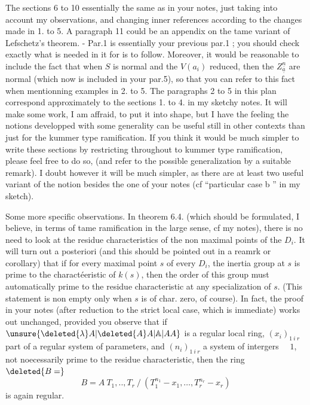 The sections 6 to 10 essentially the same as in your notes, just taking into account my observations, and changing inner references according to the changes made in 1. to 5. A paragraph 11 could be an appendix on the tame variant of Lefschetz's theorem. - Par.1 is essentially your previous par.1 ; you should check exactly what is needed in it for 
is to follow. Moreover, it would be reasonable to include the fact that when $S$ is normal and the $V(a_i)$ reduced, then the $Z^{\underline{n}}_{\underline{a}}$ are normal (which now is included in your par.5), so that you can refer to this fact when mentionning examples in  2. to 5. The paragraphs 2 to 5 in this plan correspond approximately to the sections 1. to 4. in my sketchy notes. It will make some work, I am affraid, to put it into shape, but I have the feeling the notions developped with some generality can be useful still in other contexts than just for the kummer type ramification. If you think it would be much simpler to write these sections by restricting throughout to kummer type ramification, please feel free to do so, (and refer to the possible generalization by a suitable remark). I doubt however it will be much simpler, as there are at least two useful variant of the notion besides the one of your notes (cf ``particular case b '' in my sketch).

Some more specific observations. In theorem 6.4. (which should be formulated, I believe, in terms of tame ramification in the large sense, cf my notes), there is no need to look at the residue characteristics of the non maximal points of the $D_i$. It will turn out a posteriori (and this should be pointed out in a reamrk or corollary) that  if for every maximal point $s$ of every $D_i$, the inertia group at $s$ is prime to the charactéeristic of $k(s)$, then the order of this group must  automatically prime to the residue characteristic at any specialization of $s$. (This statement is non empty only when $s$ is of char. zero, of course). In fact, the proof in your notes (after reduction to the strict local case, which is immediate) works out unchanged, provided you observe that if $\unsure{\deleted{\lambda}A|\deleted{A}A|\mathbb{A}|AA}$ is a regular local ring, $(x_i)_{1\ i\ r}$ part of a regular system of parameters, and $(n_i)_{1\ i\ r}$ a system of intergers $\quad1$, not noecessarily
prime to the residue characteristic, then the ring $\deleted{B=}$
\[
B=A\ T_1,..,T_r\ /\ (T_1^{n_1}-x_1,\ldots,T_r^{n_r}-x_r)
\]
is again regular.

